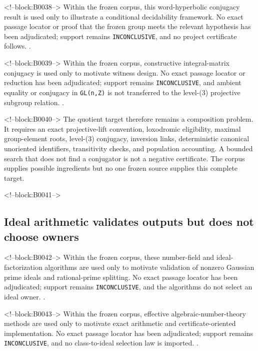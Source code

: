 \documentclass[11pt,a4paper]{article}
\begin{document}
<!--block:B0038-->
Within the frozen corpus, this word-hyperbolic conjugacy result is used only to illustrate a conditional decidability framework. No exact passage locator or proof that the frozen group meets the relevant hypothesis has been adjudicated; support remains \texttt{INCONCLUSIVE}, and no project certificate follows.
\citep{P29-S13}.

<!--block:B0039-->
Within the frozen corpus, constructive integral-matrix conjugacy is used only to motivate witness design. No exact passage locator or reduction has been adjudicated; support remains \texttt{INCONCLUSIVE}, and ambient equality or conjugacy in \texttt{GL(n,Z)} is not transferred to the level-(3) projective subgroup relation.
\citep{P29-S14}.

<!--block:B0040-->
The quotient target therefore remains a composition problem. It requires an exact projective-lift convention, loxodromic eligibility, maximal group-element roots, level-(3) conjugacy, inversion links, deterministic canonical unoriented identifiers, transitivity checks, and population accounting. A bounded search that does not find a conjugator is not a negative certificate. The corpus supplies possible ingredients but no one frozen source supplies this complete target.

<!--block:B0041-->
\subsection{Ideal arithmetic validates outputs but does not choose owners}

<!--block:B0042-->
Within the frozen corpus, these number-field and ideal-factorization algorithms are used only to motivate validation of nonzero Gaussian prime ideals and rational-prime splitting. No exact passage locator has been adjudicated; support remains \texttt{INCONCLUSIVE}, and the algorithms do not select an ideal owner.
\citep{P29-S19}.

<!--block:B0043-->
Within the frozen corpus, effective algebraic-number-theory methods are used only to motivate exact arithmetic and certificate-oriented implementation. No exact passage locator has been adjudicated; support remains \texttt{INCONCLUSIVE}, and no class-to-ideal selection law is imported.
\citep{P29-S20}.
\end{document}
